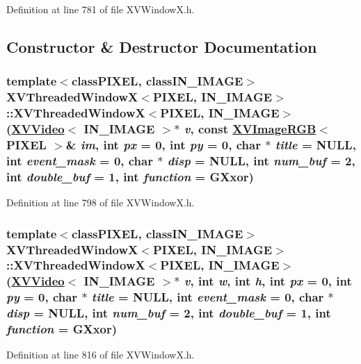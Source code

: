 Definition at line 781 of file XVWindow\-X.h.

\subsection{Constructor \& Destructor Documentation}
\label{XVThreadedWindowX_a0}
\hypertarget{class_XVThreadedWindowX_a0}{
\subsubsection[XVThreadedWindowX]{\setlength{\rightskip}{0pt plus 5cm}template$<$classPIXEL, classIN\_\-IMAGE$>$ XVThreaded\-Window\-X$<$PIXEL, IN\_\-IMAGE$>$::XVThreaded\-Window\-X$<$PIXEL, IN\_\-IMAGE$>$ (\hyperlink{class_XVVideo}{XVVideo}$<$ IN\_\-IMAGE $>$$\ast$ {\em v}, const \hyperlink{class_XVImageRGB}{XVImage\-RGB}$<$ PIXEL $>$\& {\em im}, int {\em px} = 0, int {\em py} = 0, char $\ast$ {\em title} = NULL, int {\em event\_\-mask} = 0, char $\ast$ {\em disp} = NULL, int {\em num\_\-buf} = 2, int {\em double\_\-buf} = 1, int {\em function} = GXxor)}}




Definition at line 798 of file XVWindow\-X.h.\label{XVThreadedWindowX_a1}
\hypertarget{class_XVThreadedWindowX_a1}{
\subsubsection[XVThreadedWindowX]{\setlength{\rightskip}{0pt plus 5cm}template$<$classPIXEL, classIN\_\-IMAGE$>$ XVThreaded\-Window\-X$<$PIXEL, IN\_\-IMAGE$>$::XVThreaded\-Window\-X$<$PIXEL, IN\_\-IMAGE$>$ (\hyperlink{class_XVVideo}{XVVideo}$<$ IN\_\-IMAGE $>$$\ast$ {\em v}, int {\em w}, int {\em h}, int {\em px} = 0, int {\em py} = 0, char $\ast$ {\em title} = NULL, int {\em event\_\-mask} = 0, char $\ast$ {\em disp} = NULL, int {\em num\_\-buf} = 2, int {\em double\_\-buf} = 1, int {\em function} = GXxor)}}




Definition at line 816 of file XVWindow\-X.h.

